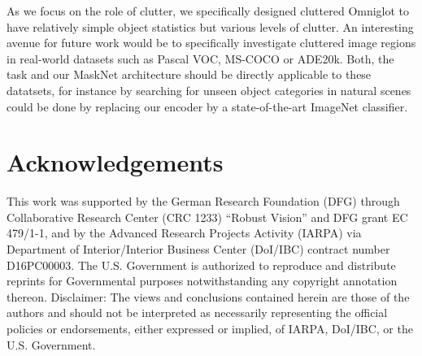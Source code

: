 \documentclass{article}
\begin{document}
As we focus on the role of clutter, we specifically designed cluttered Omniglot to have relatively simple object statistics but various levels of clutter. 
An interesting avenue for future work would be to specifically investigate cluttered image regions in real-world datasets such as Pascal VOC, MS-COCO or ADE20k. 
Both, the task and our MaskNet architecture should be directly applicable to these datatsets, for instance by searching for unseen object categories in natural scenes could be done by replacing our encoder by a state-of-the-art ImageNet classifier. 



\section*{Acknowledgements}

This work was supported by the German Research Foundation (DFG) through Collaborative Research Center (CRC 1233) ``Robust Vision'' and DFG grant EC 479/1-1, and by the Advanced Research Projects Activity (IARPA) via Department of Interior/Interior Business Center (DoI/IBC) contract number D16PC00003. The U.S. Government is authorized to reproduce and distribute reprints for Governmental purposes notwithstanding any copyright annotation thereon. Disclaimer: The views and conclusions contained herein are those of the authors and should not be interpreted as necessarily representing the official policies or endorsements, either expressed or implied, of IARPA, DoI/IBC, or the U.S. Government.
\end{document}
